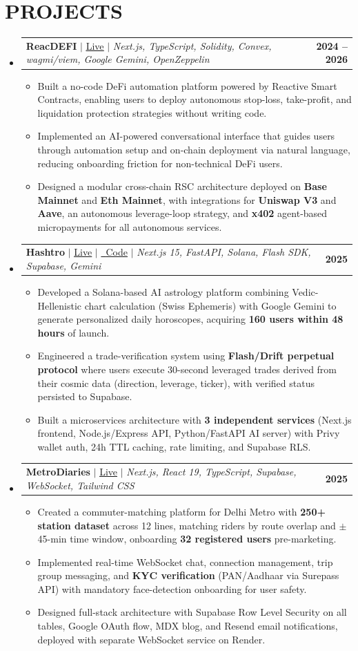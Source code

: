 \documentclass[letterpaper,10pt]{article}
\makeatletter
\newcommand{\resumeItem}[1]{
  \item\small{
    {#1 \vspace{-2pt}}
  }
}
\newcommand{\resumeProjectHeading}[2]{
    \item
    \begin{tabular*}{1.001\textwidth}{l@{\extracolsep{\fill}}r}
      \small#1 & \textbf{\small #2}\\
    \end{tabular*}\vspace{-6pt}
}
\newcommand{\resumeSubHeadingListStart}{\begin{itemize}[leftmargin=0.0in, label={}]}
\newcommand{\resumeSubHeadingListEnd}{\end{itemize}}
\newcommand{\resumeItemListStart}{\begin{itemize}}
\newcommand{\resumeItemListEnd}{\end{itemize}\vspace{-4pt}}
\makeatother
\begin{document}
\section{PROJECTS}
  \resumeSubHeadingListStart
  \resumeProjectHeading
    {\textbf{ReacDEFI} $|$ \href{https://reacdefi.app/}{\underline{Live}} $|$ \textit{Next.js, TypeScript, Solidity, Convex, wagmi/viem, Google Gemini, OpenZeppelin}}{2024 -- 2026}
    \resumeItemListStart
      \resumeItem{Built a no-code DeFi automation platform powered by Reactive Smart Contracts, enabling users to deploy autonomous stop-loss, take-profit, and liquidation protection strategies without writing code.}
      \resumeItem{Implemented an AI-powered conversational interface that guides users through automation setup and on-chain deployment via natural language, reducing onboarding friction for non-technical DeFi users.}
      \resumeItem{Designed a modular cross-chain RSC architecture deployed on \textbf{Base Mainnet} and \textbf{Eth Mainnet}, with integrations for \textbf{Uniswap V3} and \textbf{Aave}, an autonomous leverage-loop strategy, and \textbf{x402} agent-based micropayments for all autonomous services.}
    \resumeItemListEnd

  \resumeProjectHeading
    {\textbf{Hashtro} $|$ \href{https://hashtro.fun/}{\underline{Live}} $|$ \href{https://github.com/harshkas4na/Hashtro}{\raisebox{-0.1\height}\faGithub\ \underline{Code}} $|$ \textit{Next.js 15, FastAPI, Solana, Flash SDK, Supabase, Gemini}}{2025}
    \resumeItemListStart
      \resumeItem{Developed a Solana-based AI astrology platform combining Vedic-Hellenistic chart calculation (Swiss Ephemeris) with Google Gemini to generate personalized daily horoscopes, acquiring \textbf{160 users within 48 hours} of launch.}
      \resumeItem{Engineered a trade-verification system using \textbf{Flash/Drift perpetual protocol} where users execute 30-second leveraged trades derived from their cosmic data (direction, leverage, ticker), with verified status persisted to Supabase.}
      \resumeItem{Built a microservices architecture with \textbf{3 independent services} (Next.js frontend, Node.js/Express API, Python/FastAPI AI server) with Privy wallet auth, 24h TTL caching, rate limiting, and Supabase RLS.}
    \resumeItemListEnd

  \resumeProjectHeading
    {\textbf{MetroDiaries} $|$ \href{https://www.metrodiaries.in/}{\underline{Live}} $|$ \textit{Next.js, React 19, TypeScript, Supabase, WebSocket, Tailwind CSS}}{2025}
    \resumeItemListStart
      \resumeItem{Created a commuter-matching platform for Delhi Metro with \textbf{250+ station dataset} across 12 lines, matching riders by route overlap and $\pm$45-min time window, onboarding \textbf{32 registered users} pre-marketing.}
      \resumeItem{Implemented real-time WebSocket chat, connection management, trip group messaging, and \textbf{KYC verification} (PAN/Aadhaar via Surepass API) with mandatory face-detection onboarding for user safety.}
      \resumeItem{Designed full-stack architecture with Supabase Row Level Security on all tables, Google OAuth flow, MDX blog, and Resend email notifications, deployed with separate WebSocket service on Render.}
    \resumeItemListEnd
  \resumeSubHeadingListEnd
\end{document}
